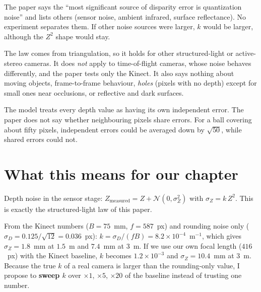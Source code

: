 \documentclass[11pt,a4paper]{article}
\begin{document}
\begin{warn}
The paper says the ``most significant source of disparity error is quantization noise'' and lists
others (sensor noise, ambient infrared, surface reflectance). No experiment separates them. If
other noise sources were larger, $k$ would be larger, although the $Z^2$ shape would stay.
\end{warn}

\begin{warn}
The law comes from triangulation, so it holds for other structured-light or active-stereo cameras.
It does \emph{not} apply to time-of-flight cameras, whose noise behaves differently, and the paper
tests only the Kinect. It also says nothing about moving objects, frame-to-frame behaviour,
\emph{holes} (pixels with no depth) except for small ones near occlusions, or reflective and
dark surfaces.
\end{warn}

\begin{warn}
The model treats every depth value as having its own independent error. The paper does not say
whether neighbouring pixels share errors. For a ball covering about fifty pixels, independent
errors could be averaged down by $\sqrt{50}$, while shared errors could not.
\end{warn}

\section{What this means for our chapter}
\label{sec:ours}

\begin{ours}
Depth noise in the sensor stage: $Z_{\text{measured}} = Z + \mathcal N(0,\sigma_Z^2)$ with
$\sigma_Z=k\,Z^2$. This is exactly the structured-light law of this paper.
\end{ours}

\begin{ours}
\label{sec:k}
From the Kinect numbers ($B=75$~mm, $f=587$~px) and rounding noise only ($\sigma_D=0.125/\sqrt{12}=
0.036$~px): $k=\sigma_D/(fB)=8.2\times10^{-4}$~m$^{-1}$, which gives $\sigma_Z=1.8$~mm at $1.5$~m
and $7.4$~mm at $3$~m. If we use our own focal length ($416$~px) with the Kinect baseline, $k$
becomes $1.2\times10^{-3}$ and $\sigma_Z=10.4$~mm at $3$~m. Because the true $k$ of a real camera is
larger than the rounding-only value, I propose to \textbf{sweep $k$} over $\times1$, $\times5$,
$\times20$ of the baseline instead of trusting one number.
\end{ours}
\end{document}
